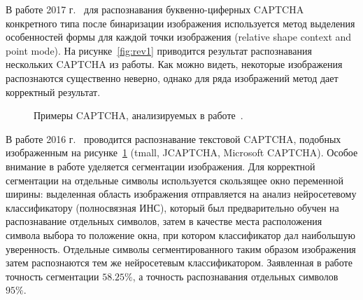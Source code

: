 \documentclass[a4paper,12pt,russian]{article} %
\begin{document}
В работе 2017 г.~\cite{an2017captcha} для распознавания буквенно-циферных CAPTCHA конкретного типа после бинаризации изображения используется метод выделения особенностей формы для каждой точки изображения (relative shape context and point mode).
На рисунке~\ref{fig:rev1} приводится результат распознавания нескольких CAPTCHA из работы.
Как можно видеть, некоторые изображения распознаются существенно неверно, однако для ряда изображений метод дает корректный результат.

\begin{figure}[t!]
	\caption{
		Примеры CAPTCHA, анализируемых в работе~\cite{hussain2016recognition}.
        }
        \label{fig:rev2}
\end{figure}

В работе 2016 г.~\cite{hussain2016recognition} проводится распознавание текстовой CAPTCHA, подобных изображенным на рисунке~\ref{fig:rev2} (tmall, JCAPTCHA, Microsoft CAPTCHA).
Особое внимание в работе уделяется сегментации изображения.
Для корректной сегментации на отдельные символы используется скользящее окно переменной ширины: выделенная область изображения отправляется на анализ нейросетевому классификатору (полносвязная ИНС), который был предварительно обучен на распознавание отдельных символов, затем в качестве места расположения символа выбора то положение окна, при котором классификатор дал наибольшую уверенность.
Отдельные символы сегментированного таким образом изображения затем распознаются тем же нейросетевым классификатором.
Заявленная в работе точность сегментации $58.25\%$, а точность распознавания отдельных символов $95\%$.
\end{document}
